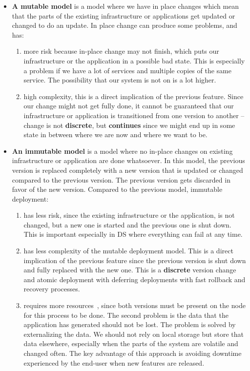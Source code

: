 \begin{itemize}
	\item \textbf{A mutable model} is a model where we have in place changes which mean that the parts of the existing infrastructure or applications get updated or changed to do an update. In place change can produce some problems, and has:
	
	\begin{enumerate}[start=1,label={(\bfseries \arabic*)}]
		\item more risk because in-place change may not finish, which puts our infrastructure or the application in a possible bad state. This is especially a problem if we have a lot of services and multiple copies of the same service. The possibility that our system is not on is a lot higher.
		\item high complexity, this is a direct implication of the previous feature. Since our change might not get fully done, it cannot be guaranteed that our infrastructure or application is transitioned from one version to another -- change is not \textbf{discrete}, but \textbf{continues} since we might end up in some state in between where we are now and where we want to be.
	\end{enumerate}
	
	\item \textbf{An immutable model} is a model where no in-place changes on existing infrastructure or application are done whatsoever. In this model, the previous version is replaced completely with a new version that is updated or changed compared to the previous version. The previous version gets discarded in favor of the new version. Compared to the previous model, immutable deployment:
	
	\begin{enumerate}[start=1,label={(\bfseries \arabic*)}]
		\item has less risk, since the existing infrastructure or the application, is not changed, but a new one is started and the previous one is shut down. This is important especially in DS where everything can fail at any time.
		\item has less complexity of the mutable deployment model. This is a direct implication of the previous feature since the previous version is shut down and fully replaced with the new one. This is a \textbf{discrete} version change and atomic deployment with deferring deployments with fast rollback and recovery processes.
		\item requires more resources~\cite{Helland16}, since both versions must be present on the node for this process to be done. The second problem is the data that the application has generated should not be lost. The problem is solved by externalizing the data. We should not rely on local storage but store that data elsewhere, especially when the parts of the system are volatile and changed often. The key advantage of this approach is avoiding downtime experienced by the end-user when new features are released. 
	\end{enumerate}
\end{itemize}

